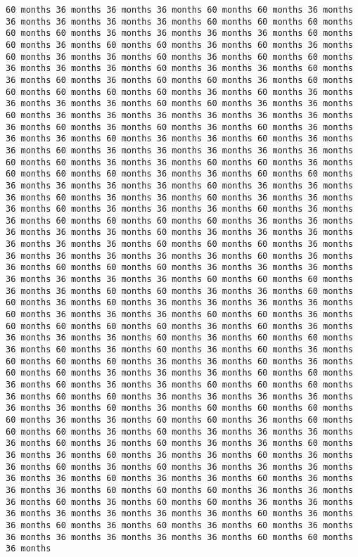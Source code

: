 \documentclass[11pt]{article}
\begin{document}
\begin{Verbatim}[commandchars=\\\{\}, frame=single, framerule=2mm, rulecolor=\color{outerrorbackground}]
60 months 36 months 36 months 36 months 60 months 60 months 36 months 36 months 36 months 36 months 36 months 60 months 60 months 60 months 60 months 60 months 36 months 36 months 36 months 36 months 60 months 60 months 36 months 60 months 60 months 36 months 60 months 36 months 60 months 36 months 36 months 60 months 36 months 60 months 60 months 36 months 36 months 36 months 60 months 36 months 36 months 60 months 36 months 60 months 36 months 60 months 60 months 36 months 60 months 60 months 60 months 60 months 60 months 36 months 60 months 36 months 36 months 36 months 36 months 60 months 60 months 36 months 36 months 60 months 36 months 36 months 36 months 36 months 36 months 36 months 36 months 60 months 36 months 60 months 36 months 60 months 36 months 36 months 36 months 60 months 36 months 36 months 60 months 36 months 36 months 60 months 36 months 36 months 36 months 36 months 36 months 60 months 60 months 36 months 36 months 60 months 60 months 36 months 60 months 60 months 60 months 36 months 36 months 60 months 60 months 36 months 36 months 36 months 36 months 60 months 36 months 36 months 36 months 60 months 36 months 36 months 60 months 36 months 36 months 36 months 60 months 36 months 36 months 36 months 60 months 36 months 36 months 60 months 60 months 60 months 60 months 36 months 36 months 36 months 36 months 36 months 60 months 36 months 36 months 36 months 36 months 36 months 36 months 60 months 60 months 60 months 36 months 36 months 36 months 36 months 36 months 36 months 60 months 36 months 36 months 60 months 60 months 60 months 36 months 36 months 36 months 36 months 36 months 36 months 36 months 60 months 60 months 60 months 36 months 36 months 60 months 60 months 36 months 36 months 60 months 60 months 36 months 60 months 36 months 36 months 36 months 36 months 60 months 36 months 36 months 36 months 60 months 60 months 36 months 60 months 60 months 60 months 60 months 36 months 60 months 36 months 36 months 36 months 36 months 60 months 36 months 60 months 60 months 36 months 60 months 36 months 60 months 36 months 60 months 36 months 60 months 60 months 60 months 36 months 36 months 60 months 36 months 60 months 60 months 36 months 36 months 36 months 60 months 60 months 36 months 60 months 36 months 36 months 60 months 60 months 60 months 36 months 60 months 60 months 36 months 36 months 36 months 36 months 36 months 36 months 60 months 36 months 60 months 60 months 60 months 60 months 36 months 36 months 60 months 60 months 36 months 60 months 60 months 60 months 36 months 60 months 36 months 36 months 36 months 36 months 60 months 36 months 60 months 36 months 36 months 60 months 36 months 36 months 60 months 36 months 36 months 60 months 36 months 36 months 60 months 36 months 60 months 36 months 36 months 36 months 36 months 36 months 60 months 36 months 36 months 60 months 36 months 36 months 36 months 60 months 60 months 60 months 36 months 36 months 36 months 60 months 36 months 60 months 60 months 36 months 36 months 36 months 36 months 36 months 36 months 36 months 60 months 36 months 36 months 60 months 36 months 60 months 36 months 60 months 36 months 36 months 36 months 36 months 36 months 36 months 60 months 60 months 36 months 
\end{Verbatim}
\end{document}
